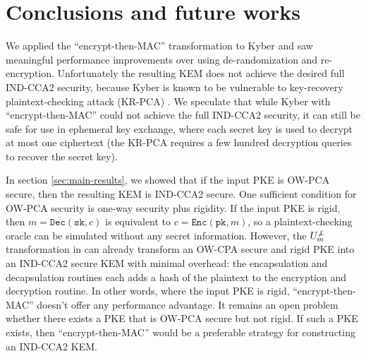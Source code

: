 \documentclass[floatrow,journal=tches,submission]{iacrtrans}
\newcommand{\encrypt}{\texttt{Enc}}
\newcommand{\decrypt}{\texttt{Dec}}
\newcommand{\pk}{\texttt{pk}}
\newcommand{\sk}{\texttt{sk}}
\begin{document}
\section{Conclusions and future works}\label{sec:future-works}
We applied the ``encrypt-then-MAC'' transformation to Kyber and saw meaningful performance improvements over using de-randomization and re-encryption. Unfortunately the resulting KEM does not achieve the desired full IND-CCA2 security, because Kyber is known to be vulnerable to key-recovery plaintext-checking attack (KR-PCA) \cite{ravi2019generic}\cite{ueno2022curse}. We speculate that while Kyber with ``encrypt-then-MAC'' could not achieve the full IND-CCA2 security, it can still be safe for use in ephemeral key exchange, where each secret key is used to decrypt at most one ciphertext (the KR-PCA requires a few hundred decryption queries to recover the secret key).

In section \ref{sec:main-results}, we showed that if the input PKE is OW-PCA secure, then the resulting KEM is IND-CCA2 secure. One sufficient condition for OW-PCA security is one-way security plus rigidity. If the input PKE is rigid, then $m = \decrypt(\sk, c)$ is equivalent to $c = \encrypt(\pk, m)$, so a plaintext-checking oracle can be simulated without any secret information. However, the $U_m^{\not\bot}$ transformation in \cite{hofheinz2017modular} can already transform an OW-CPA secure and rigid PKE into an IND-CCA2 secure KEM with minimal overhead: the encapsulation and decapsulation routines each adds a hash of the plaintext to the encryption and decryption routine. In other words, where the input PKE is rigid, ``encrypt-then-MAC'' doesn't offer any performance advantage. It remains an open problem whether there exists a PKE that is OW-PCA secure but not rigid. If such a PKE exists, then ``encrypt-then-MAC'' would be a preferable strategy for constructing an IND-CCA2 KEM.





\end{document}
